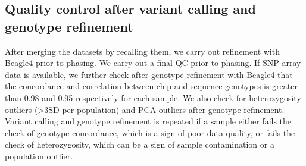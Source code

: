 \subsection{Quality control after variant calling and genotype refinement}
After merging the datasets by recalling them, we carry out refinement with Beagle4 prior to phasing. We carry out a final QC prior to phasing. If SNP array data is available, we further check after genotype refinement with Beagle4 that the concordance and correlation between chip and sequence genotypes is greater than 0.98 and 0.95 respectively for each sample. We also check for heterozygosity outliers (\textgreater3SD per population) and PCA outliers after genotype refinement. Variant calling and genotype refinement is repeated if a sample either fails the check of genotype concordance, which is a sign of poor data quality, or fails the check of heterozygosity, which can be a sign of sample contamination or a population outlier.